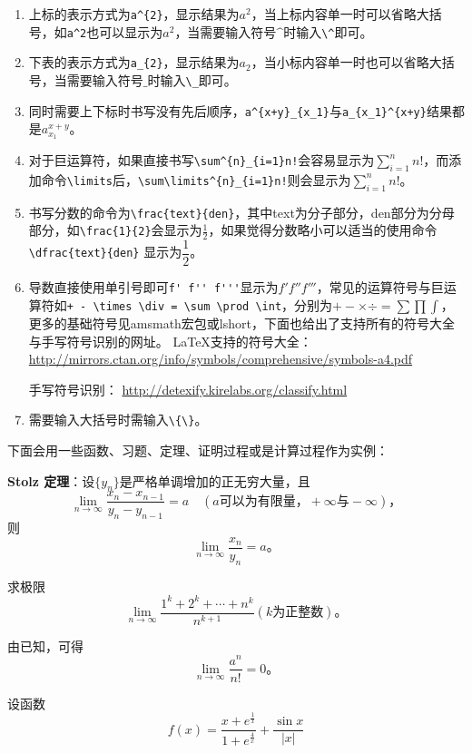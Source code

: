 \begin{enumerate}[1.]
\item 上标的表示方式为\verb|a^{2}|，显示结果为$a^{2}$，当上标内容单一时可以省略大括号，如\verb|a^2|也可以显示为$a^2$，当需要输入符号$\^$时输入\verb|\^|即可。
\item 下表的表示方式为\verb|a_{2}|，显示结果为$a_{2}$，当小标内容单一时也可以省略大括号，当需要输入符号$\_$时输入\verb|\_|即可。
\item 同时需要上下标时书写没有先后顺序，\verb|a^{x+y}_{x_1}|与\verb|a_{x_1}^{x+y}|结果都是$a_{x_1}^{x+y}$。
\item 对于巨运算符，如果直接书写\verb|\sum^{n}_{i=1}n!|会容易显示为$\sum^{n}_{i=1}n!$，而添加命令\verb|\limits|后，\verb|\sum\limits^{n}_{i=1}n!|则会显示为$\sum\limits^{n}_{i=1}n!$。
\item 书写分数的命令为\verb|\frac{text}{den}|，其中text为分子部分，den部分为分母部分，如\verb|\frac{1}{2}|会显示为$\frac{1}{2}$，如果觉得分数略小可以适当的使用命令\verb|\dfrac{text}{den}|
显示为$\dfrac{1}{2}$。
\item 导数直接使用单引号即可\verb|f' f'' f'''|显示为$f' f'' f'''$，常见的运算符号与巨运算符如\verb|+ - \times \div = \sum \prod \int|，分别为$+ - \times \div = \sum \prod \int$，更多的基础符号见amsmath宏包或lshort，下面也给出了支持所有的符号大全与手写符号识别的网址。
\LaTeX 支持的符号大全：
\url{http://mirrors.ctan.org/info/symbols/comprehensive/symbols-a4.pdf}

手写符号识别：
\url{http://detexify.kirelabs.org/classify.html}
\item 需要输入大括号时需输入\verb|\{\}|。
\end{enumerate}
下面会用一些函数、习题、定理、证明过程或是计算过程作为实例：

\textbf{Stolz 定理}：设$\{y_n\}$是严格单调增加的正无穷大量，且
\[
\lim\limits_{n \to \infty}\frac{x_n-x_{n-1}}{y_n-y_{n-1}}=a\quad (a\text{可以为有限量，}+\infty\text{与}-\infty)\text{，}
\]
则
\[
\lim\limits_{n \to \infty}\frac{x_n}{y_n}=a\text{。}
\]

求极限
\[
\lim\limits_{n \to \infty}\frac{1^k+2^k+\cdots+n^k}{n^{k+1}}(k\text{为正整数})\text{。}
\]

由已知，可得
\begin{equation}\label{equ1}
\lim\limits_{n \to \infty}\frac{a^n}{n!}=0\text{。}
\end{equation}

设函数
\begin{equation}
	f(x)=\frac{x+e^{\frac{1}{x}}}{1+e^{\frac{4}{x}}}+\frac{\sin x}{|x|}
\end{equation}

